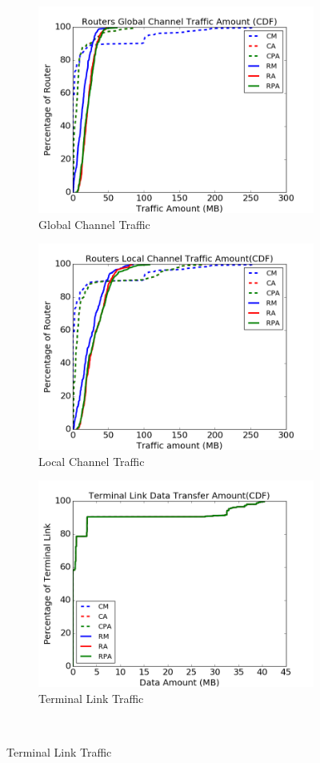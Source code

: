 \documentclass[conference,compsoc]{IEEEtran}
\begin{document}
\begin{figure}[t!]
    \centering
    \begin{subfigure}[t]{0.32\textwidth}
        \centering
        \includegraphics[height=1.8 in]{wkld/gc-traffic}
        \caption{Global Channel Traffic}
        \label{fig:global-channel-traffic}
    \end{subfigure}\hfill
    \hspace{1em}%
    \begin{subfigure}[t]{0.32\textwidth}
        \centering
        \includegraphics[height=1.8 in]{wkld/lc-traffic}
        \caption{Local Channel Traffic}
        \label{fig:local-channel-traffic}
    \end{subfigure}\hfill
    \hspace{1em}%
    \begin{subfigure}[t]{0.32\textwidth}
        \centering
        \includegraphics[height=1.8 in]{wkld/tl-traffic}
        \caption{Terminal Link Traffic}
        \label{fig:terminal-link-traffic}
    \end{subfigure}\\


\end{figure}
\end{document}
